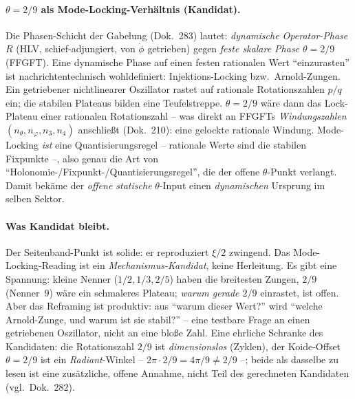 \paragraph{$\theta=2/9$ als Mode-Locking-Verhältnis (Kandidat).} Die Phasen-Schicht der Gabelung
(Dok.~283) lautet: \emph{dynamische Operator-Phase $R$} (HLV, schief-adjungiert, von $\dot\phi$
getrieben) gegen \emph{feste skalare Phase $\theta=2/9$} (FFGFT). Eine dynamische Phase auf einen
festen rationalen Wert \enquote{einzurasten} ist nachrichtentechnisch wohldefiniert: Injektions-Locking
bzw.\ Arnold-Zungen. Ein getriebener nichtlinearer Oszillator rastet auf rationale Rotationszahlen
$p/q$ ein; die stabilen Plateaus bilden eine Teufelstreppe. $\theta=2/9$ wäre dann das Lock-Plateau
einer rationalen Rotationszahl -- was direkt an FFGFTs \emph{Windungszahlen}
$(n_\theta,n_\varphi,n_3,n_4)$ anschließt (Dok.~210): eine gelockte rationale Windung. Mode-Locking
\emph{ist} eine Quantisierungsregel -- rationale Werte sind die stabilen Fixpunkte --, also genau die
Art von \enquote{Holonomie-/Fixpunkt-/Quantisierungsregel}, die der offene $\theta$-Punkt verlangt.
Damit bekäme der \emph{offene statische} $\theta$-Input einen \emph{dynamischen} Ursprung im selben
Sektor.

\paragraph{Was Kandidat bleibt.} Der Seitenband-Punkt ist solide: er reproduziert $\xi/2$ zwingend. Das
Mode-Locking-Reading ist ein \emph{Mechanismus-Kandidat}, keine Herleitung. Es gibt eine Spannung:
kleine Nenner ($1/2,1/3,2/5$) haben die breitesten Zungen, $2/9$ (Nenner~9) wäre ein schmaleres
Plateau; \emph{warum gerade $2/9$} einrastet, ist offen. Aber das Reframing ist produktiv: aus
\enquote{warum dieser Wert?} wird \enquote{welche Arnold-Zunge, und warum ist sie stabil?} -- eine
testbare Frage an einen getriebenen Oszillator, nicht an eine bloße Zahl. Eine ehrliche Schranke des
Kandidaten: die Rotationszahl $2/9$ ist \emph{dimensionslos} (Zyklen), der Koide-Offset $\theta=2/9$ ist
ein \emph{Radiant}-Winkel -- $2\pi\cdot2/9=4\pi/9\neq2/9$ --; beide als dasselbe zu lesen ist eine
zusätzliche, offene Annahme, nicht Teil des gerechneten Kandidaten (vgl.\ Dok.~282).

